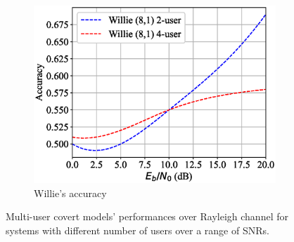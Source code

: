 \begin{figure}[tp!]
\begin{subfigure}{0.28\textwidth}
		\includegraphics[width=\linewidth]{figs/multi_willie_accuracy_rayleigh}
		\caption{Willie's accuracy}
		\label{fig:multi_rayleigh_results_willie}
	\end{subfigure}
	\caption{Multi-user covert models' performances over Rayleigh channel for systems with different number of users over a range of SNRs.}
	\label{fig:multi_rayleigh_results}
\end{figure}
